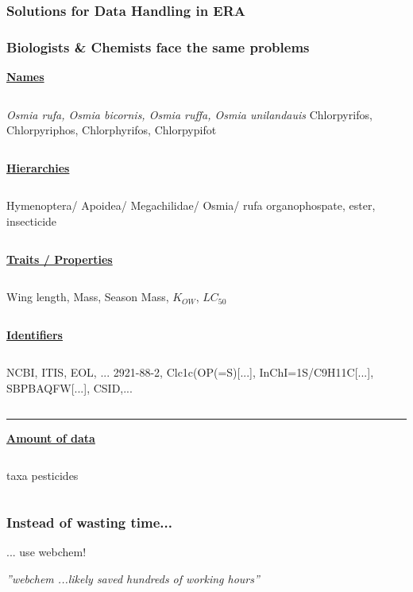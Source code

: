 \documentclass[
	10pt
	]{beamer}
\begin{document}
\begin{frame}[noframenumbering]
\frametitle{Solutions for Data Handling in ERA}
 \resizebox{11.5cm}{!}{%
				
				}
\end{frame}

\begin{frame}
\frametitle{Biologists \& Chemists face the same problems}
	\small
	\centering
	\pause
	\textbf{\alert{\underline{Names}}}
	\begin{columns}[t]
	\emph{Osmia rufa, Osmia bicornis, Osmia ruffa, Osmia unilandauis} 
	Chlorpyrifos, Chlorpyriphos, Chlorphyrifos, Chlorpypifot
	\end{columns}
	\pause

	\centering
	\textbf{\alert{\underline{Hierarchies}}}
	\begin{columns}[t]
	Hymenoptera/ Apoidea/ Megachilidae/ Osmia/ rufa 
	organophospate, ester, insecticide
	\end{columns}
	\pause

	\centering
	\textbf{\alert{\underline{Traits / Properties}}}
	\begin{columns}[t]
	Wing length, Mass, Season 
	Mass, $K_{OW}$, $LC_{50}$
	\end{columns}
	\pause

	\centering
	\textbf{\alert{\underline{Identifiers}}}
	\begin{columns}[t]
	NCBI, ITIS, EOL, ... 
	2921-88-2, Clc1c(OP(=S)[...], InChI=1S/C9H11C[...], SBPBAQFW[...], CSID,...
	\end{columns}
	\vspace{0.8em}
	\pause

	\rule{\textwidth}{1pt}
	\textbf{\alert{\underline{Amount of data}}}

	\begin{columns}[t]
	 taxa
	 pesticides
	\end{columns}
\end{frame}



{%
\begin{frame}{}
\frametitle{Instead of wasting time...}
... use \alert{webchem}! \\
	\hspace*{2cm}
	\begin{adjustbox}{max totalsize={\textwidth}{0.8\textheight}}
				
	\end{adjustbox}

\pause
\vspace*{-1cm}\emph{''\alert{webchem} ...likely saved hundreds of working hours''}
\end{frame}
}
\end{document}
